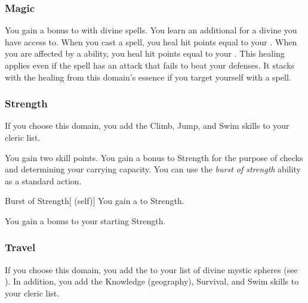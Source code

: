         \subsubsection{Magic}
             You gain a  bonus to  with divine spells.
             You learn an additional  for a divine  you have access to.
             When you cast a spell, you heal hit points equal to your .
             When you are affected by a  ability, you heal hit points equal to your .
            This healing applies even if the spell has an attack that fails to beat your defenses.
            It stacks with the healing from this domain's essence if you target yourself with a spell.

        \subsubsection{Strength}
            If you choose this domain, you add the Climb, Jump, and Swim skills to your cleric  list.

             You gain two skill points.
             You gain a  bonus to Strength for the purpose of checks and determining your carrying capacity.
             You can use the \textit{burst of strength} ability as a standard action.
            \begin{attuneability}{Burst of Strength}[ (self)]
                You gain a   to Strength.
            \end{attuneability}
             You gain a  bonus to your starting Strength.

        \subsubsection{Travel}
            If you choose this domain, you add the   to your list of divine mystic spheres (see ).
            In addition, you add the Knowledge (geography), Survival, and Swim skills to your cleric  list.

